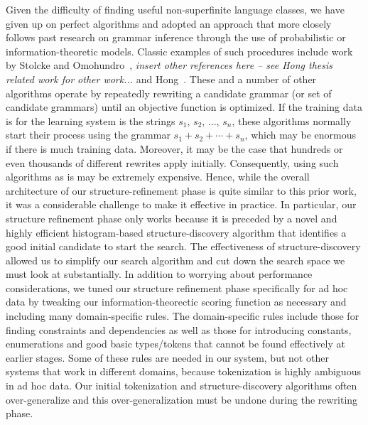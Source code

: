 Given the difficulty of finding useful non-superfinite language classes,
we have given up on perfect algorithms and adopted an approach that
more closely follows past research on grammar inference
through the use of probabilistic or information-theoretic
models.  Classic examples of such procedures include work by Stolcke and
Omohundro~\cite{stolcke94inducing}, {\em insert other references here -- see Hong thesis related work for other work...} and 
Hong~\cite{hong01using,hong:thesis}.  These and a number of other algorithms
operate by repeatedly rewriting a candidate grammar (or set of candidate
grammars) until an objective function is optimized.
If the training data is for the learning system is the strings
$s_1$, $s_2$, $\ldots$, $s_n$, these algorithms normally start their
process using the grammar $s_1 + s_2 + \cdots + s_n$, which may
be enormous if there is much training data.  
Moreover, it may be the case that 
hundreds or even thousands of different rewrites apply initially.
Consequently, using such algorithms as is may be extremely expensive.
Hence, while 
the overall architecture of our structure-refinement phase is
quite similar to this prior work, it was a considerable challenge to make
it effective in practice.  In particular, our structure refinement
phase only works because it is preceded by a novel and highly efficient
histogram-based structure-discovery algorithm 
that identifies a good initial candidate to start the search.  
The effectiveness of structure-discovery allowed us to 
simplify our search algorithm and cut down the search space we must
look at substantially.  In addition to worrying about
performance considerations, we tuned our structure refinement phase
specifically for ad hoc data by tweaking our information-theorectic
scoring function as necessary and including many domain-specific rules.  
The domain-specific rules include those for finding constraints and 
dependencies as well as those for introducing constants, enumerations and
good basic types/tokens that cannot be found effectively at earlier stages.
Some of these rules are needed in our system, but not other systems
that work in different domains, because
tokenization is highly ambiguous in ad hoc data.
Our initial tokenization and structure-discovery algorithms often 
over-generalize and this over-generalization must be undone during
the rewriting phase.
  


